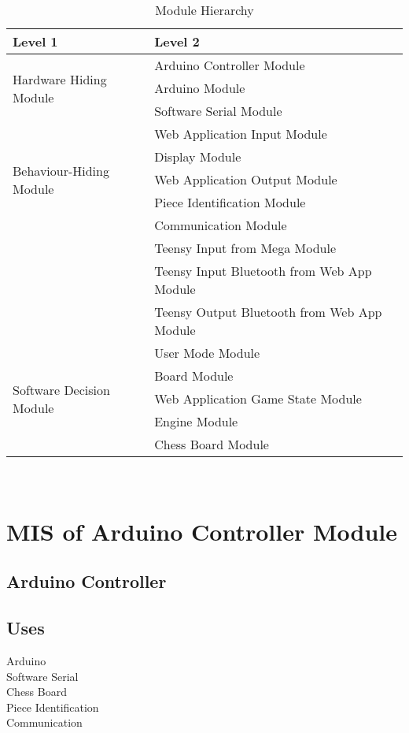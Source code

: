 \documentclass[12pt, titlepage]{article}
\begin{document}
\begin{table}[h!]
\centering
\begin{tabular}{p{} p{}}
\toprule
\textbf{Level 1} & \textbf{Level 2}\\
\midrule


\multirow{3}{0.3\textwidth}{Hardware Hiding Module}
& Arduino Controller Module \\ 
& Arduino Module \\
& Software Serial Module \\
\midrule

\multirow{5}{0.3\textwidth}{Behaviour-Hiding Module} 
& Web Application Input Module\\
& Display Module\\
& Web Application Output Module\\
& Piece Identification Module \\
& Communication Module\\
& Teensy Input from Mega Module\\
& Teensy Input Bluetooth from Web App Module\\
& Teensy Output Bluetooth from Web App Module\\
\midrule

\multirow{5}{0.3\textwidth}{Software Decision Module} 
& User Mode Module\\
& Board Module\\
& Web Application Game State Module\\
& Engine Module\\
& Chess Board Module\\
\bottomrule

\end{tabular}
\caption{Module Hierarchy}
\label{TblMH}
\end{table}

\newpage
~\newpage


\section{MIS of Arduino Controller Module} \label{ArduinoControllerModule}

\subsection{Arduino Controller}

\subsection{Uses}
Arduino\\
Software Serial\\
Chess Board\\
Piece Identification\\
Communication\\
\end{document}
